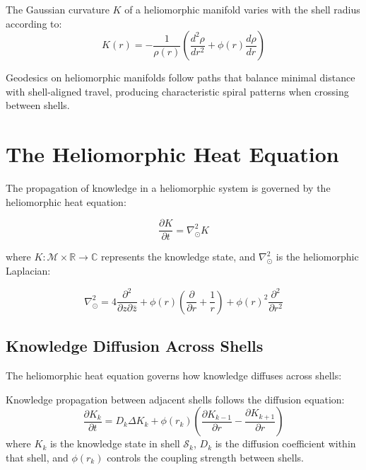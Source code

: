 \begin{proposition}
The Gaussian curvature $K$ of a heliomorphic manifold varies with the shell radius according to:
\begin{equation}
K(r) = -\frac{1}{\rho(r)}\left(\frac{d^2\rho}{dr^2} + \phi(r)\frac{d\rho}{dr}\right)
\end{equation}
\end{proposition}

Geodesics on heliomorphic manifolds follow paths that balance minimal distance with shell-aligned travel, producing characteristic spiral patterns when crossing between shells.

\section{The Heliomorphic Heat Equation}

The propagation of knowledge in a heliomorphic system is governed by the heliomorphic heat equation:

\begin{equation}
\frac{\partial K}{\partial t} = \nabla_{\odot}^2 K
\end{equation}

where $K: \mathcal{M} \times \mathbb{R} \rightarrow \mathbb{C}$ represents the knowledge state, and $\nabla_{\odot}^2$ is the heliomorphic Laplacian:

\begin{equation}
\nabla_{\odot}^2 = 4\frac{\partial^2}{\partial z \partial \bar{z}} + \phi(r)\left(\frac{\partial}{\partial r} + \frac{1}{r}\right) + \phi(r)^2\frac{\partial^2}{\partial r^2}
\end{equation}

\subsection{Knowledge Diffusion Across Shells}

The heliomorphic heat equation governs how knowledge diffuses across shells:

\begin{theorem}
Knowledge propagation between adjacent shells follows the diffusion equation:
\begin{equation}
\frac{\partial K_k}{\partial t} = D_k \Delta K_k + \phi(r_k) \left(\frac{\partial K_{k-1}}{\partial r} - \frac{\partial K_{k+1}}{\partial r}\right)
\end{equation}
where $K_k$ is the knowledge state in shell $\mathcal{S}_k$, $D_k$ is the diffusion coefficient within that shell, and $\phi(r_k)$ controls the coupling strength between shells.
\end{theorem}

